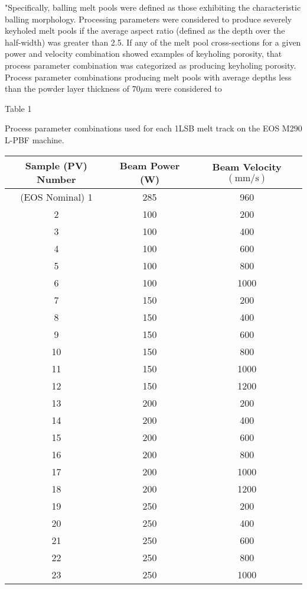 \documentclass[10pt]{article}
\begin{document}
"Specifically, balling melt pools were defined as those exhibiting the characteristic balling morphology. Processing parameters were considered to produce severely keyholed melt pools if the average aspect ratio (defined as the depth over the half-width) was greater than 2.5. If any of the melt pool cross-sections for a given power and velocity combination showed examples of keyholing porosity, that process parameter combination was categorized as producing keyholing porosity. Process parameter combinations producing melt pools with average depths less than the powder layer thickness of $70 \mu \mathrm{m}$ were considered to

Table 1

Process parameter combinations used for each 1LSB melt track on the EOS M290 L-PBF machine.

\begin{center}
\begin{tabular}{|c|c|c|}
\hline
Sample (PV) Number & Beam Power (W) & Beam Velocity $(\mathrm{mm} / \mathrm{s})$ \\
\hline
(EOS Nominal) 1 & 285 & 960 \\
\hline
2 & 100 & 200 \\
\hline
3 & 100 & 400 \\
\hline
4 & 100 & 600 \\
\hline
5 & 100 & 800 \\
\hline
6 & 100 & 1000 \\
\hline
7 & 150 & 200 \\
\hline
8 & 150 & 400 \\
\hline
9 & 150 & 600 \\
\hline
10 & 150 & 800 \\
\hline
11 & 150 & 1000 \\
\hline
12 & 150 & 1200 \\
\hline
13 & 200 & 200 \\
\hline
14 & 200 & 400 \\
\hline
15 & 200 & 600 \\
\hline
16 & 200 & 800 \\
\hline
17 & 200 & 1000 \\
\hline
18 & 200 & 1200 \\
\hline
19 & 250 & 200 \\
\hline
20 & 250 & 400 \\
\hline
21 & 250 & 600 \\
\hline
22 & 250 & 800 \\
\hline
23 & 250 & 1000 \\

\end{tabular}
\end{center}
\end{document}
